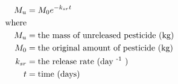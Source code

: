 \documentclass[fleqn, oneside, 11pt]{article}%
\begin{document}
\begin{preview}
\begin{align*}%
M_{u} & = M_{0}e^{-k_{sr}t} \\ 
\text{where} \nonumber \\
M_{u} & =  \text{the mass of unreleased pesticide (kg)} \nonumber \\
M_{0} & =  \text{the original amount of pesticide (kg)} \nonumber \\
k_{sr} & =  \text{the release rate (day \textsuperscript{-1} )} \nonumber \\
t & =  \text{time (days)} \nonumber \\
\end{align*} 
\end{preview}
\end{document}
